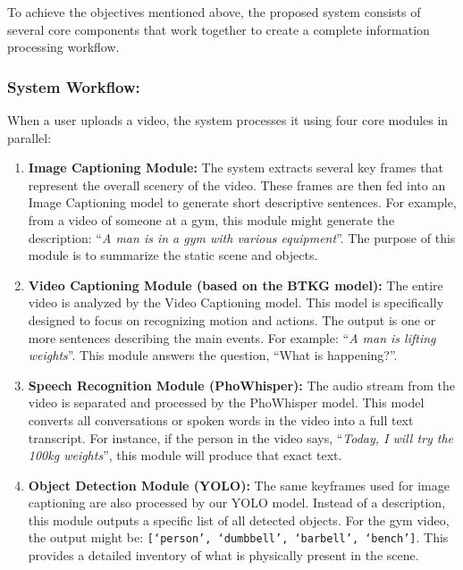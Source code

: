 To achieve the objectives mentioned above, the proposed system consists of several core components that work together to create a complete information processing workflow.

\subsubsection*{System Workflow:}

When a user uploads a video, the system processes it using four core modules in parallel:

\begin{enumerate}
    \item \textbf{Image Captioning Module:} The system extracts several key frames that represent the overall scenery of the video. These frames are then fed into an Image Captioning model to generate short descriptive sentences. For example, from a video of someone at a gym, this module might generate the description: ``\textit{A man is in a gym with various equipment}''. The purpose of this module is to summarize the static scene and objects.
    
    \item \textbf{Video Captioning Module (based on the BTKG model):} The entire video is analyzed by the Video Captioning model. This model is specifically designed to focus on recognizing motion and actions. The output is one or more sentences describing the main events. For example: ``\textit{A man is lifting weights}''. This module answers the question, ``What is happening?''.
    
    \item \textbf{Speech Recognition Module (PhoWhisper):} The audio stream from the video is separated and processed by the PhoWhisper model. This model converts all conversations or spoken words in the video into a full text transcript. For instance, if the person in the video says, ``\textit{Today, I will try the 100kg weights}'', this module will produce that exact text.
    
    \item \textbf{Object Detection Module (YOLO):} The same keyframes used for image captioning are also processed by our YOLO model. Instead of a description, this module outputs a specific list of all detected objects. For the gym video, the output might be: \texttt{[`person', `dumbbell', `barbell', `bench']}. This provides a detailed inventory of what is physically present in the scene.
\end{enumerate}

